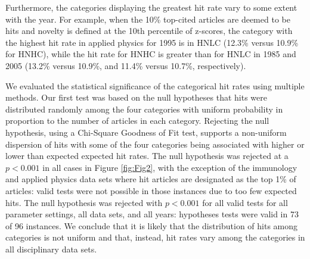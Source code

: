 \documentclass[NETN]{stjour}
\begin{document}
Furthermore, the categories displaying the greatest hit rate vary to some extent with the year. For example, when the 10\% top-cited articles are deemed to be hits and novelty is defined at the 10th percentile of z-scores, the category with the highest hit rate in applied physics for 1995 is in HNLC (12.3\% versus 10.9\% for HNHC), while the hit rate for HNHC is greater than for HNLC in 1985 and 2005 (13.2\% versus 10.9\%, and 11.4\% versus 10.7\%, respectively).

We evaluated the statistical significance of the categorical hit rates using multiple methods.  Our first test was based on the null hypotheses that hits were distributed randomly among the four categories with uniform probability in proportion to the number of articles in each category. Rejecting the null hypothesis, using a Chi-Square Goodness of Fit test, supports a non-uniform dispersion of hits with some of the four categories being associated with higher or lower than expected expected hit rates. The null hypothesis was rejected at a $p<0.001$ in all cases in  Figure \ref{fig:Fig2}, with the exception of the immunology and applied physics data sets where hit articles are designated as the top 1\% of articles: valid tests were not possible in those instances due to too few expected hits. The null hypothesis was rejected with $p<0.001$ for all valid tests for all parameter settings, all data sets, and all years: hypotheses tests were valid in 73 of 96 instances. We conclude that it is likely that the distribution of hits among categories is not uniform and that, instead, hit rates vary among the categories in all disciplinary data sets. 
\end{document}
